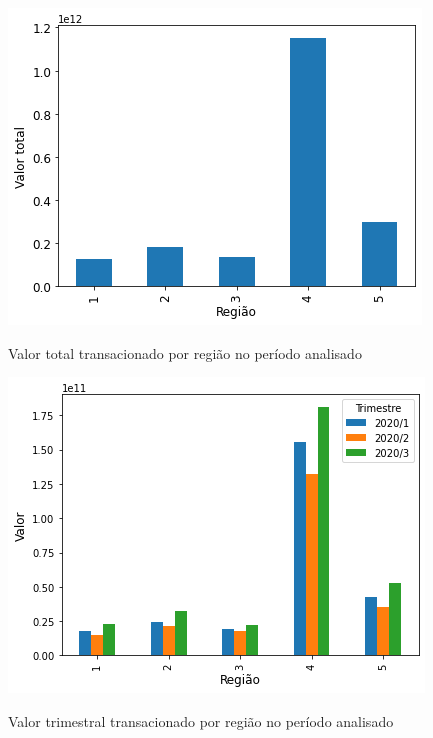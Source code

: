 \begin{figure}[htb]
	\centering
    \caption{Valor total transacionado por região no período analisado}
    \includegraphics[scale=0.7]{images/base-de-dados-11.1-valor-total-por-regiao.png}
    \label{fig:pandemia:base-de-dados-11.1-valor-total-por-regiao}
    \fdadospesquisa
\end{figure}

\begin{figure}[htb]
	\centering
    \caption{Valor trimestral transacionado por região no período analisado}
    \includegraphics[scale=0.7]{images/base-de-dados-21.1-valor-trimestral-por-regiao.png}
    \label{fig:pandemia:base-de-dados-21.1-valor-trimestral-por-regiao}
    \fdadospesquisa
\end{figure}

